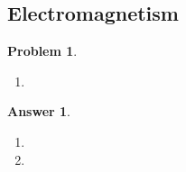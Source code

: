 \documentclass[a4paper]{article}
\newtheorem{ans}{Answer}[subsection]
\theoremstyle{new}
\newtheorem{qns}{Problem}[section]
\begin{document}
\subsection*{Electromagnetism}
\begin{qns}\leavevmode
\begin{enumerate}[label=(\alph*)]
\item 

\end{enumerate}
\end{qns}
\begin{ans}\leavevmode
\begin{enumerate}[label=(\alph*)]
\item

\item 
\end{enumerate}
\end{ans}
\newpage
\end{document}
